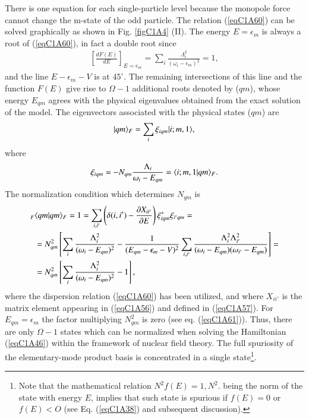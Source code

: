  There is one equation for each single-particle level because the monopole force cannot change the m-state of the odd particle. The relation (\ref{eqC1A60}) can be solved graphically as shown in Fig. \ref{figC1A4} (II). The energy $E =\epsilon_m$ is always a root of (\ref{eqC1A60}), in fact a double root since 
  \begin{align}\label{eqC1A61} 
 \left[\frac{dF(E)}{dE}\right]_{E=\epsilon_m}=\sum_i\frac{\Lambda^2_i}{\left(\omega_i-\epsilon_m\right)^2}=1,
  \end{align}
and the line $E-\epsilon_m-V$ is at $45^\circ$. The remaining intersections of this line and the function $F(E)$ give rise to $\Omega-1$ additional roots denoted by ($qm$), whose energy $E_{qm}$ agrees with the physical eigenvalues obtained from the exact solution of the model. 
The eigenvectors associated with the physical states ($qm$) are 
  \begin{align}\label{eqC1A62} 
 |{qm} \rangle_F=\sum_i\xi_{iqm}|{i;m,1} \rangle,
  \end{align}
where 
  \begin{align}\label{eqC1A63} 
 \xi_{iqm}=-N_{qm}\frac{\Lambda_i}{\omega_i-E_{qm}}=\langle {i;m,1|qm} \rangle_F.
  \end{align}
The normalization condition which determines $N_{qm}$ is   \begin{align}\label{eqC1A64} 
\nonumber _F&\langle {qm|qm} \rangle_F=1=\sum_{i,i'}\left(\delta(i,i')-\frac{\partial X_{ii'}}{\partial E}\right)\xi^*_{iqm}\xi_{i'qm}=\\
\nonumber &=N^2_{qm}\left[\sum_i\frac{\Lambda^2_i}{(\omega_i-E_{qm})^2}-\frac{1}{(E_{qm}-\epsilon_m-V)^2}\sum_{i,i'}\frac{\Lambda^2_i\Lambda^2_{i'}}{(\omega_i-E_{qm})(\omega_{i'}-E_{qm})}\right]=\\
 &=N^2_{qm}\left[\sum_i\frac{\Lambda_i^2}{(\omega_i-E_{qm})^2}-1\right],
  \end{align}
where the dispersion relation (\ref{eqC1A60}) has been utilized, and where $X_{ii'}$ is the matrix element appearing in (\ref{eqC1A56}) and defined in (\ref{eqC1A57}). For $E_{qm}=\epsilon_m$ the factor multiplying $N^2_{qm}$ is zero (see eq. (\ref{eqC1A61})). Thus, there are only $\Omega-1$ states which can be normalized when solving the Hamiltonian (\ref{eqC1A46}) within the framework of  nuclear field theory. The full spuriosity of the elementary-mode product basis is concentrated in a single state\footnote{ Note that the mathematical relation $N^2f(E)=1, N^2$. being the norm of the state with energy $E$, implies that such state is spurious if $f(E)= 0$ or $f(E)<O$ (see Eq. (\ref{eqC1A38}) and subsequent discussion).}.

